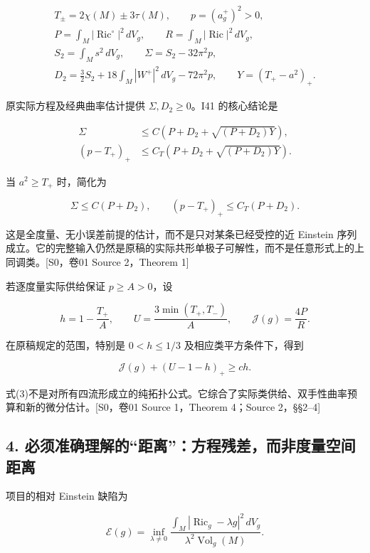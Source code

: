 \documentclass[UTF8,a4paper,11pt,fontset=fandol]{ctexart}
\begin{document}
\[
\begin{gathered}
T_\pm=2\chi(M)\pm3\tau(M),\qquad p=(a_g^+)^2>0,\\
P=\int_M|\operatorname{Ric}^{\circ}|^2\,dV_g,
\qquad R=\int_M|\operatorname{Ric}|^2\,dV_g,\\
S_2=\int_Ms^2\,dV_g,\qquad
\Sigma=S_2-32\pi^2p,\\
D_2=\frac32S_2+18\int_M|W^+|^2\,dV_g-72\pi^2p,
\qquad Y=(T_+-a^2)_+.
\end{gathered}
\]

原实际方程及经典曲率估计提供 \(\Sigma,D_2\ge0\)。I41 的核心结论是

\[
\boxed{
\begin{aligned}
\Sigma&\le C\left(P+D_2+\sqrt{(P+D_2)Y}\right),\\
(p-T_+)_+&\le C_T\left(P+D_2+\sqrt{(P+D_2)Y}\right).
\end{aligned}}
\tag{1}
\]

当 \(a^2\ge T_+\) 时，简化为

\[
\boxed{\Sigma\le C(P+D_2),\qquad
(p-T_+)_+\le C_T(P+D_2).}
\tag{2}
\]

这是全度量、无小误差前提的估计，而不是只对某条已经受控的近 Einstein
序列成立。它的完整输入仍然是原稿的实际共形单极子可解性，而不是任意形式上的上同调类。{[}S0，卷01
Source 2，Theorem 1{]}

若逐度量实际供给保证 \(p\ge A>0\)，设

\[
h=1-\frac{T_+}{A},\qquad
U=\frac{3\min(T_+,T_-)}A,\qquad
\mathcal J(g)=\frac{4P}{R}.
\]

在原稿规定的范围，特别是 \(0<h\le1/3\) 及相应类平方条件下，得到

\[
\boxed{\mathcal J(g)+(U-1-h)_+\ge ch.}
\tag{3}
\]

式(3)不是对所有四流形成立的纯拓扑公式。它综合了实际类供给、双手性曲率预算和新的微分估计。{[}S0，卷01
Source 1，Theorem 4；Source 2，§§2--4{]}

\subsection{4.
必须准确理解的``距离''：方程残差，而非度量空间距离}\label{ux5fc5ux987bux51c6ux786eux7406ux89e3ux7684ux8dddux79bbux65b9ux7a0bux6b8bux5deeux800cux975eux5ea6ux91cfux7a7aux95f4ux8dddux79bb}

项目的相对 Einstein 缺陷为

\[
\mathcal E(g)=\inf_{\lambda\ne0}
\frac{\int_M|\operatorname{Ric}_g-\lambda g|^2\,dV_g}
{\lambda^2\operatorname{Vol}_g(M)}.
\tag{4}
\]
\end{document}
